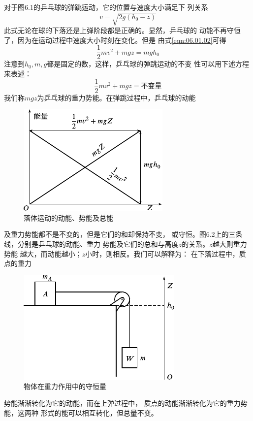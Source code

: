 对于图6.1的乒乓球的弹跳运动，它的位置与速度大小满足下
列关系
\begin{equation}\label{eqn:06.01.02}
  v = \sqrt { 2 g \left( h _ { 0 } - z \right) }
\end{equation}
此式无论在球的下落还是上弹阶段都是正确的。显然，乒乓球的
动能不再守恒了，因为在运动过程中速度大小时刻在变化。但是
由式\eqref{eqn:06.01.02}可得
\begin{equation}\label{eqn:06.01.03}
  \frac { 1 } { 2 } m v ^ { 2 } + m g z = m g h _ { 0 }
\end{equation}
注意到$ h _ { 0 } , m , g $都是固定的数，这样，乒乓球的弹跳运动的不变
性可以用下述方程来表述：
\begin{equation}\label{eqn:06.01.04}
  \frac { 1 } { 2 } m v ^ { 2 } + m g z = \text{不变量}
\end{equation}
我们称$ mgz $为乒乓球的重力势能。在弹跳过程中，乒乓球的动能
\begin{figure}
  \centering
  \includegraphics{figure/fig06.02}\vspace{0.6em}
  \caption{落体运动的动能、势能及总能}
  \label{fig:06.02}
\end{figure}
及重力势能都不是不变的，但是它们的和却保持不变，
或守恒。图6.2上的三条线，分别是乒乓球的动能、重力
势能及它们的总和与高度$ z $的关系。$ z $越大则重力势能
越大，而动能越小；$ z $小时，则相反。我们可以解释为：
在下落过程中，质点的重力
\clearpage
\begin{figure}
  \vspace{1em}
  \centering
  \includegraphics{figure/fig06.03}\vspace{1em}
  \caption{物体在重力作用中的守恒量}
  \label{fig:06.03}
\end{figure}
\noindent 势能渐渐转化为它的动能，而在上弹过程中，
质点的动能渐渐转化为它的重力势能，这两种
形式的能可以相互转化，但总量不变。

